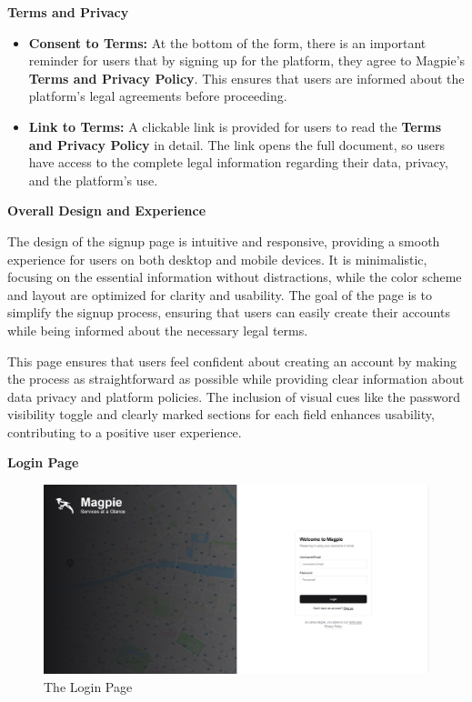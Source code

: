 \newpage{}

\textbf{Terms and Privacy}

\begin{itemize}
    \item{} \textbf{Consent to Terms:} At the bottom of the form, there is an
    important reminder for users that by signing up for the platform, they agree
    to Magpie's \textbf{Terms and Privacy Policy}. This ensures that users are
    informed about the platform's legal agreements before proceeding. 
    \item{} \textbf{Link to Terms:} A clickable link is provided for users to
    read the \textbf{Terms and Privacy Policy} in detail. The link opens the
    full document, so users have access to the complete legal information
    regarding their data, privacy, and the platform's use.
\end{itemize}

\textbf{Overall Design and Experience}

The design of the signup page is intuitive and responsive, providing a smooth
experience for users on both desktop and mobile devices. It is minimalistic,
focusing on the essential information without distractions, while the color
scheme and layout are optimized for clarity and usability. The goal of the page
is to simplify the signup process, ensuring that users can easily create their
accounts while being informed about the necessary legal terms.

This page ensures that users feel confident about creating an account by making
the process as straightforward as possible while providing clear information
about data privacy and platform policies. The inclusion of visual cues like the
password visibility toggle and clearly marked sections for each field enhances
usability, contributing to a positive user experience.

\textbf{Login Page}

\begin{figure}[htbp]
    \centering{}
    \includegraphics[width=1\textwidth]{images/site/login/login_page.png}
    \caption{The Login Page}
\end{figure}

